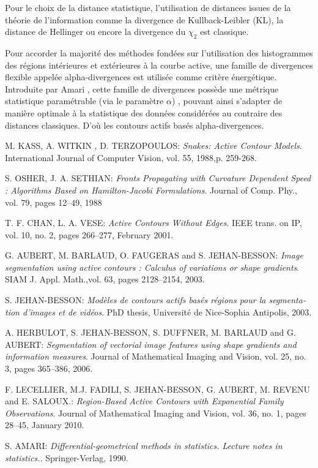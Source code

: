 \documentclass[11pt]{article}
\begin{document}
Pour le choix de la distance statistique, l’utilisation de distances issues de la théorie de l’information comme la divergence de Kullback-Leibler (KL), la distance de Hellinger ou encore la divergence du $ {\chi}_2 $ est classique.

Pour accorder la majorité des méthodes fondées sur l’utilisation des histogrammes des régions intérieures et extérieures à la courbe active, une famille de divergences flexible appelée alpha-divergences est utilisée comme critère énergétique. Introduite par Amari \cite{Amari-1990}, cette famille de divergences possède une métrique statistique paramétrable (via le paramètre $ \alpha $) , pouvant ainsi s’adapter de manière optimale à la statistique des données considérées au contraire des distances classiques. D'où les contours actifs basés alpha-divergences.


\begin{thebibliography}{2}
M. KASS, A. WITKIN , D. TERZOPOULOS:
\textit{Snakes: Active Contour Models}.
International Journal of Computer Vision, vol. 55, 1988,p. 259-268.

S. OSHER, J. A. SETHIAN:
\textit{Fronts Propagating with Curvature Dependent Speed :
Algorithms Based on Hamilton-Jacobi Formulations}.
Journal of Comp. Phy., vol. 79, pages 12–49, 1988

T. F. CHAN, L. A. VESE:
\textit{Active Contours Without Edges}.
IEEE trans. on IP, vol. 10, no. 2, pages 266–277, February 2001.

G. AUBERT, M. BARLAUD, O. FAUGERAS and S. JEHAN-BESSON:
\textit{Image segmentation using active contours : Calculus of variations or shape gradients}.
SIAM J. Appl. Math.,vol. 63, pages 2128–2154, 2003.

S. JEHAN-BESSON:
\textit{Modèles de contours actifs basés régions pour la segmenta-
tion d’images et de vidéos}.
PhD thesis, Université de Nice-Sophia Antipolis, 2003.

A. HERBULOT, S. JEHAN-BESSON, S. DUFFNER, M. BARLAUD and G. AUBERT:
\textit{Segmentation of vectorial image features using shape gradients and information measures}.
Journal of Mathematical Imaging and Vision, vol. 25, no. 3, pages 365–386, 2006.

F. LECELLIER, M.J. FADILI, S. JEHAN-BESSON, G. AUBERT, M. REVENU and E. SALOUX.:
\textit{Region-Based Active Contours with Exponential Family Observations}.
Journal of Mathematical Imaging and Vision, vol. 36, no. 1, pages 28–45, January 2010.

S. AMARI:
\textit{Differential-geometrical methods in statistics. Lecture notes in statistics.}.
Springer-Verlag, 1990.



\end{thebibliography}
\end{document}
